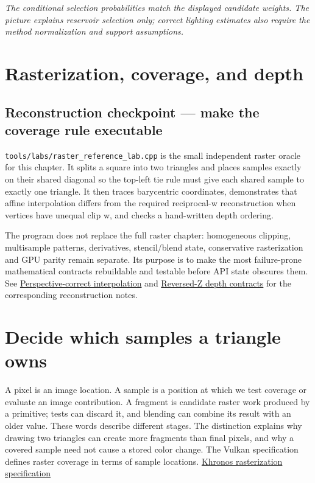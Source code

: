 \emph{The conditional selection probabilities match the displayed candidate weights. The picture explains reservoir selection only; correct lighting estimates also require the method normalization and support assumptions.}

\section{Rasterization, coverage, and depth}\label{03-visual-computing-i-ch012-rasterization-coverage-and-depth}

\subsection{Reconstruction checkpoint --- make the coverage rule executable}\label{03-visual-computing-i-ch012-reconstruction-checkpoint-make-the-coverage-rule-executable}

\texttt{tools/labs/raster\_reference\_lab.cpp} is the small independent raster oracle for this chapter. It splits a square into two triangles and places samples exactly on their shared diagonal so the top-left tie rule must give each shared sample to exactly one triangle. It then traces barycentric coordinates, demonstrates that affine interpolation differs from the required reciprocal-w reconstruction when vertices have unequal clip w, and checks a hand-written depth ordering.

The program does not replace the full raster chapter: homogeneous clipping, multisample patterns, derivatives, stencil/blend state, conservative rasterization and GPU parity remain separate. Its purpose is to make the most failure-prone mathematical contracts rebuildable and testable before API state obscures them. See \hyperref[appendix-1ed5f96c73ea]{Perspective-correct interpolation} and \hyperref[appendix-275ec8847057]{Reversed-Z depth contracts} for the corresponding reconstruction notes.

\section{Decide which samples a triangle owns}\label{03-visual-computing-i-ch012-decide-which-samples-a-triangle-owns}

A pixel is an image location. A sample is a position at which we test coverage or evaluate an image contribution. A fragment is candidate raster work produced by a primitive; tests can discard it, and blending can combine its result with an older value. These words describe different stages. The distinction explains why drawing two triangles can create more fragments than final pixels, and why a covered sample need not cause a stored color change. The Vulkan specification defines raster coverage in terms of sample locations. \href{https://docs.vulkan.org/spec/latest/chapters/primsrast.html}{Khronos rasterization specification}


